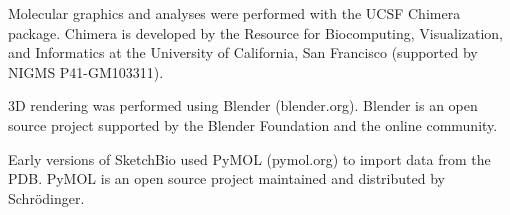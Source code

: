 \documentclass[twocolumn]{bmcart}%
\begin{document}
Molecular graphics and analyses were performed with the UCSF Chimera package. Chimera is developed by the Resource for Biocomputing, Visualization, and Informatics at the University of California, San Francisco (supported by NIGMS P41-GM103311).

3D rendering was performed using Blender (blender.org). Blender is an open source project supported by the Blender Foundation and the online community.

Early versions of SketchBio used PyMOL (pymol.org) to import data from the PDB.  PyMOL is an open source project maintained and distributed by Schrödinger.

\end{document}
